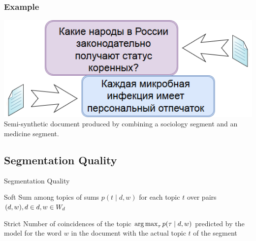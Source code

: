 \documentclass[russian]{beamer}
\begin{document}
	\begin{frame}
		\frametitle{Example}
		\centering
        \includegraphics[width=.85\textwidth]{pn_gen_diagram.png}\\

       Semi-synthetic document produced by combining a sociology segment and an medicine segment.
	\end{frame}

\subsection{Segmentation Quality}

\begin{frame}{Segmentation Quality}
  \begin{block}{Soft}
    Sum among topics of sums $p(t \mid d, w)$ for each topic $t$ over pairs $(d, w), d \hm\in d, w \hm\in W_d$
  \end{block}
  
  \begin{block}{Strict}
    Number of coincidences of the topic $\operatorname*{arg\,max}_\tau p(\tau \mid d, w)$ predicted by the model for the word $w$ in the document with the actual topic $t$ of the segment
  \end{block}
\end{frame}
\end{document}
